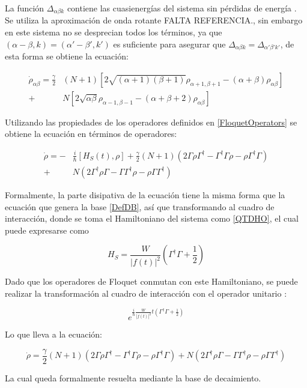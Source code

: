 \documentclass[a4paper,10pt]{report}
\begin{document}
La función $\Delta_{\alpha \beta k}$ contiene las cuasienergías del sistema sin pérdidas de energía \cite{HanngiDQS}. Se utiliza la aproximación de onda rotante FALTA REFERENCIA., sin embargo en este sistema no se desprecian todos los términos, ya que $(\alpha-\beta,k)=(\alpha'-\beta',k')$ es suficiente para asegurar que $\Delta_{\alpha \beta k}=\Delta_{\alpha' \beta' k'}$, de esta forma se obtiene la ecuación:

\begin{align*}
\dot{\rho}_{\alpha \beta} = \frac{\gamma}{2}&(N+1)[2\sqrt{(\alpha+1)(\beta + 1)}\rho_{\alpha+1,\beta+1} - (\alpha + \beta)\rho_{\alpha \beta}]\\
+& N[2\sqrt{\alpha \beta}\rho_{\alpha-1,\beta-1} - (\alpha + \beta + 2)\rho_{\alpha \beta}]
\end{align*}

Utilizando las propiedades de los operadores definidos en \ref{FloquetOperators} se obtiene la ecuación en términos de operadores:

\begin{align*}
\dot{\rho} = -&\frac{i}{\hbar}[H_S (t),\rho] + \frac{\gamma}{2}(N+1)(2\Gamma\rho\Gamma^\dagger - \Gamma^\dagger\Gamma \rho - \rho \Gamma^\dagger \Gamma )\\
 +& N(2\Gamma^\dagger \rho \Gamma - \Gamma \Gamma^\dagger \rho - \rho \Gamma\Gamma^\dagger)
\end{align*}

Formalmente, la parte disipativa de la ecuación tiene la misma forma que la ecuación que genera la base \ref{DefDB}, así que transformando al cuadro de interacción, donde se toma el Hamiltoniano del sistema como \ref{QTDHO}, el cual puede expresarse como\cite{BrownPT}

\begin{equation}
H_S = \frac{W}{|f(t)|^2}(\Gamma^\dagger \Gamma + \frac{1}{2})
\end{equation}

Dado que los operadores de Floquet conmutan con este Hamiltoniano, se puede realizar la transformación al cuadro de interacción con el operador unitario \cite{SakuraiQM}:

\begin{equation}
 e^{\frac{i}{\hbar}\frac{W}{|f(t)|^2}t(\Gamma^\dagger \Gamma + \frac{1}{2})}
\end{equation}

Lo que lleva a la ecuación:

\begin{equation}
\dot{\rho}=\frac{\gamma}{2}(N+1)(2\Gamma\rho\Gamma^\dagger - \Gamma^\dagger\Gamma \rho - \rho \Gamma^\dagger \Gamma )
 + N(2\Gamma^\dagger \rho \Gamma - \Gamma \Gamma^\dagger \rho - \rho \Gamma\Gamma^\dagger)
\end{equation}

La cual queda formalmente resuelta mediante la base de decaimiento.



\end{document}
